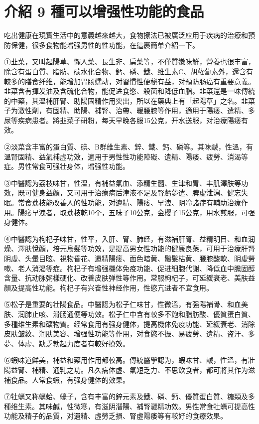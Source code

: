 \documentclass[12pt,UTF8]{ctexbook}
\begin{document}
\section{介紹 9 種可以增强性功能的食品}

吃出健康在現實生活中的意義越來越大，食物撩法已被廣泛应用于疾病的治療和預防保健，很多食物能增强男性的性功能，在這裹簡单介紹一下。

①韭菜，又叫起陽草、懶人菜、長生非、扁菜等，不僅質嫩味鮮，營養也很丰富，除含有蛋白質、脂肪、碳水化合物、鈣、磷、鐵、维生素C、胡蘿蔔素外，還含有較多的膳食纤维，能增加胃肠蠕动，对習慣性便秘有益，对預防肠癌有重要意義。韭菜含有揮发油及含硫化合物，能促进食慾、殺菌和降低血脂。韭菜還是一味傳統的中藥，其溫補肝腎、助陽固精作用突出，所以在藥典上有「起陽草」之名。韭菜子为激性劑，有固精、助陽、補腎、治帶、暖腰膝等作用，適用于陽痿、遣精、多尿等疾病患者。將韭菜子研粉，每天早晚各服15公克，开水送服，对治療陽痿有效。

②淡菜含丰富的蛋白質、碘、B群维生素、鋅、鐵、鈣、磷等。其味鹹，性溫，有溫腎固精、益氣補虚功效，適用于男性性功能障礙、遺精、陽痿、疲勞、消渴等症。男性常食可强壮身体，增强性功能。

③中醫認为荔枝味甘，性溫，有補益氣血、添精生髓、生津和胃、丰肌澤肤等功效，既可健身益顏，又可用于治療病后津液不足及腎虧夢遣、脾虚泄潟、健忘失眠。常食荔枝能改善人的性功能，对遺精、陽痿、早洩、阴冷諸症有輔助治療作用。陽痿早洩者，取荔枝乾10个，五味子10公克，金樱子15公克，用水煎服，可强身健体。

④中醫認为枸杞子味甘，性平，入肝、腎、肺经，有滋補肝腎、益精明目、和血润燥、澤肤悅顏，培元烏髮等功效，是提高男女性功能的健康良藥，可用于治療肝腎阴虛、头暈目眩、視物昏花、遗精陽痿、面色暗黄、鬚髮枯黄、腰膝酸軟、阴虛勞嗽、老人消渴等症。枸杞子有增强機体免疫功能、促进細胞代謝、降低血中膽固醇含量、抗动脉粥樣硬化、改善皮肤弹性等作用。常服枸杞子，可延緩衰老、美肤益顏及提高性功能。枸杞子有兴奋性神经作用，性慾亢进者不宜食用。

⑤松子是重要的壮陽食品。中醫認为松子仁味甘，性微溫，有强陽補骨、和血美肤、润肺止咳、滑肠通便等功效。松子仁中含有較多不飽和脂肪酸、優質蛋白質、多種维生素和礦物質。经常食用有强身健体，提高機体免疫功能、延緩衰老、消除皮肤皱紋、润肤美容、增强性功能等作用，对食慾不振、易疲勞、遺精、盗汗、多夢、体虚、缺乏勃起力度者有較好撩效。

⑥蝦味道鮮美，補益和藥用作用都較高。傳統醫學認为，蝦味甘、鹹，性溫，有壯陽益腎、補精、通乳之功。凡久病体虚、氣短乏力、不思飲食者，都可將其作为滋補食品。人常食蝦，有强身健体的效果。

⑦牡蠣又称蠣蛤、蠔子，含有丰富的鋅元素及鐵、磷、鈣、優質蛋白質、糖類及多種维生素。其味鹹，性微寒，有滋阴潛陽、補腎澀精功效。男性常食牡蠣可提高性功能及精子的品質，对遺精、虛勞乏損、腎虛陽痿等有較好的食療效果。
\end{document}

